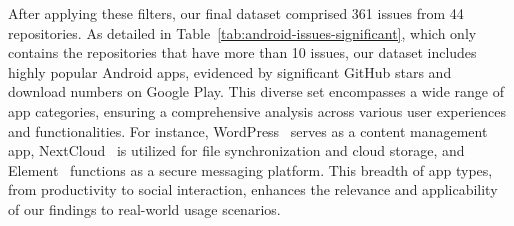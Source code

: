 After applying these filters, our final dataset comprised 361 issues from 44 repositories. As detailed in Table~\ref{tab:android-issues-significant}, which only contains the repositories that have more than 10 issues, our dataset includes highly popular Android apps, evidenced by significant GitHub stars and download numbers on Google Play. This diverse set encompasses a wide range of app categories, ensuring a comprehensive analysis across various user experiences and functionalities. For instance, WordPress~\cite{wordpress} serves as a content management app, NextCloud~\cite{nextcloud-android} is utilized for file synchronization and cloud storage, and Element~\cite{element-android} functions as a secure messaging platform. This breadth of app types, from productivity to social interaction, enhances the relevance and applicability of our findings to real-world usage scenarios.

